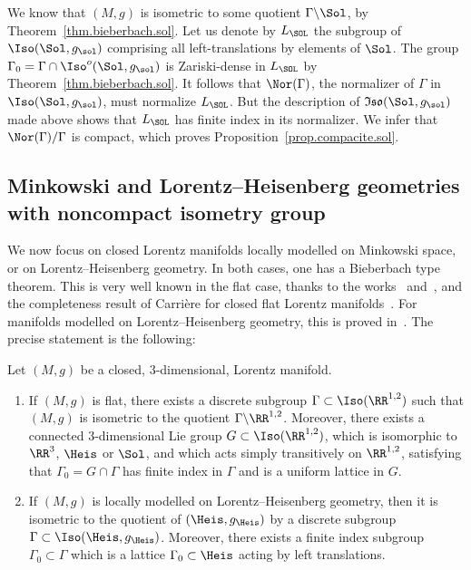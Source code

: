 We know that $(M,g)$ is isometric to some quotient $\Gamma \backslash \Sol$, by Theorem~\ref{thm.bieberbach.sol}. Let us denote by $L_{\SOL}$ the subgroup of $\Iso(\Sol,g_{\sol})$ comprising all left-translations by elements of $\Sol$. The group $\Gamma_0=\Gamma \cap \Iso^o(\Sol,g_{\sol})$ is Zariski-dense in $L_{\SOL}$ by Theorem~\ref{thm.bieberbach.sol}. It follows that $\Nor(\Gamma)$, the normalizer of $\Gamma$ in $\Iso(\Sol,g_{\sol})$, must normalize $L_{\SOL}$. But the description of $\mathfrak{Iso}(\Sol,g_{\sol})$ made above shows that $L_{\SOL}$ has finite index in its normalizer. We infer that $\Nor(\Gamma)/\Gamma$ is compact, which proves Proposition~\ref{prop.compacite.sol}.


\subsection{Minkowski and Lorentz--Heisenberg geometries with noncompact isometry group}\label{sec.minkowski}
We now focus on closed Lorentz manifolds locally modelled on Minkowski space, or on Lorentz--Heisenberg geometry. In both cases, one has a Bieberbach type theorem. This is very well known in the flat case, thanks to the works~\cite{fried.goldman} and~\cite{goldman.kami}, and the completeness result of Carrière for closed flat Lorentz manifolds~\cite{carriere}. For manifolds modelled on Lorentz--Heisenberg geometry, this is proved in~\cite[Proposition~8.1]{sorin.ghani}. The precise statement is the following:

\begin{theo}\label{thm.bieberbach.minkowski}
Let $(M,g)$ be a closed, $3$-dimensional, Lorentz manifold.
\begin{enumerate}
\item \label{list4.5.1}If $(M,g)$ is flat, there exists a discrete subgroup $\Gamma \subset \Iso(\RR^{1,2})$ such that $(M,g)$ is isometric to the quotient $\Gamma \backslash \RR^{1,2}$. Moreover, there exists a connected $3$-dimensional Lie group $G \subset \Iso(\RR^{1,2})$, which is isomorphic to $\RR^3$, $\Heis$ or $\Sol$, and which acts simply transitively on $\RR^{1,2}$, satisfying that $\Gamma_0=G \cap \Gamma$ has finite index in $\Gamma$ and is a uniform lattice in $G$.
\item \label{list4.5.2}If $(M,g)$ is locally modelled on Lorentz--Heisenberg geometry, then it is isometric to the quotient of $(\Heis,g_{\Heis})$ by a discrete subgroup $\Gamma \subset \Iso(\Heis,g_{\Heis})$. Moreover, there exists a finite index subgroup $\Gamma_0 \subset \Gamma$ which is a lattice $\Gamma_0 \subset \Heis$ acting by left translations.
\end{enumerate}
\end{theo}


